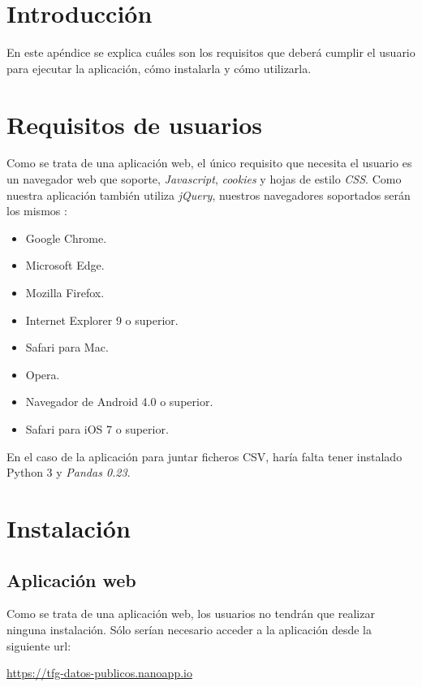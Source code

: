 
\section{Introducción}

En este apéndice se explica cuáles son los requisitos que deberá cumplir el usuario para ejecutar la aplicación, cómo instalarla y cómo utilizarla.

\section{Requisitos de usuarios}

Como se trata de una aplicación web, el único requisito que necesita el usuario es un navegador web que soporte, \textit{Javascript}, \textit{cookies} y hojas de estilo \textit{CSS}. Como nuestra aplicación también utiliza \textit{jQuery}, nuestros navegadores soportados serán los mismos \cite{misc:jquerybrowsers}:

\begin{itemize}
	\item Google Chrome.
	\item Microsoft Edge.
	\item Mozilla Firefox.
	\item Internet Explorer 9 o superior.
	\item Safari para Mac.
	\item Opera.
	\item Navegador de Android 4.0 o superior.
	\item Safari para iOS 7 o superior.
\end{itemize}

En el caso de la aplicación para juntar ficheros CSV, haría falta tener instalado Python 3 y \textit{Pandas 0.23}.

\section{Instalación}

\subsection{Aplicación web}

Como se trata de una aplicación web, los usuarios no tendrán que realizar ninguna instalación. Sólo serían necesario acceder a la aplicación desde la siguiente url:

\href{https://tfg-datos-publicos.nanoapp.io}{https://tfg-datos-publicos.nanoapp.io}

